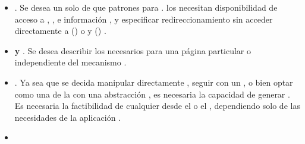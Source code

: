 \begin{itemize}
	\item
		\textbf{\routingAS}. Se desea un solo \setPL de \routesPC que \mapCPT patrones \uriNAME para \routePC \handlersAS. los \routePC \handlersAS necesitan disponibilidad de acceso a \httpNAME \headersINT, \cookiesINT, e información \uriNAME, y especificar redireccionamiento sin acceder directamente a \windowLocationINT(\browserINT) o \reqNodeINT y \resNodeINT (\nodejsNAME) \cite{online_isom_js_future_web_apps}.
	\item
		\textbf{\fetchingPC y \persistingPC \dataPC}. Se desea describir los \resourcesCPT necesarios para \renderCPT una página particular o \componentAS independiente del mecanismo \fetchingPC \cite{online_isom_js_future_web_apps}.
	\item
		\textbf{\viewRenderingAS}. Ya sea que se decida manipular directamente \htmldomNAME, seguir con un \templatingAS \htmlNAME \stringBasePL, o bien optar como una de la \componentAS \uiSiglaAS con una abstracción \htmldomNAME, es necesaria la capacidad de generar \markupPL \isomorphicallyAS. Es necesaria la factibilidad de \renderCPT cualquier \viewAS desde el \serverAS o el \clientAS, dependiendo solo de las necesidades de la aplicación \cite{online_isom_js_future_web_apps}.
	\item

\end{itemize}
